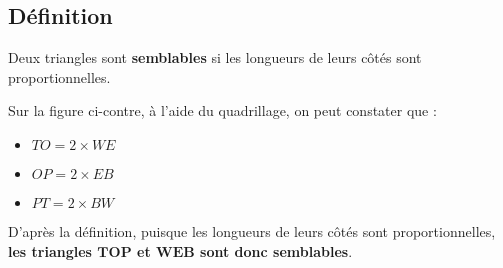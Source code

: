 \subsection{Définition}
\begin{definition}
    Deux triangles sont \textbf{semblables} si les longueurs de leurs côtés sont proportionnelles.
\end{definition}
\begin{exemple*1}

    \begin{minipage}{0.55\linewidth}        
    \end{minipage}
    \hfill
    \begin{minipage}{0.45\linewidth}
        Sur la figure ci-contre, à l'aide du quadrillage, on peut constater que :
        \begin{itemize}
            \item $TO =2\times WE$
            \item $OP =2\times EB$
            \item $PT =2\times BW$
        \end{itemize}
        D'après la définition, puisque les longueurs de leurs côtés sont proportionnelles, \textbf{les triangles $\mathbf{TOP}$ et $\mathbf{WEB}$ sont donc semblables}.
    \end{minipage}
\end{exemple*1}

